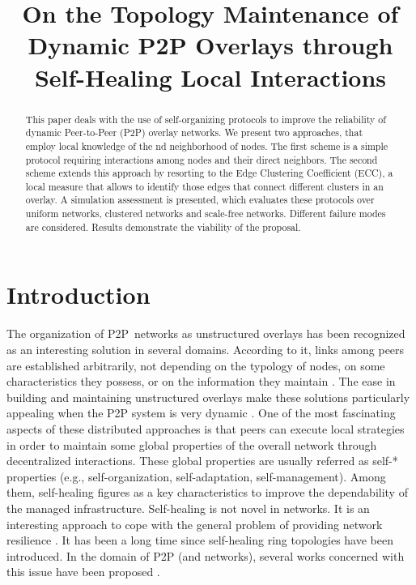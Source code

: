 \documentclass[10pt, conference, compsocconf]{IEEEtran}
\begin{document}
 
\title{On the Topology Maintenance of Dynamic P2P Overlays through Self-Healing Local Interactions}
\author{
}

\maketitle              
\begin{abstract}
This paper deals with the use of self-organizing protocols to improve the reliability of dynamic Peer-to-Peer (P2P) overlay networks. We present two approaches, that employ local knowledge of the nd neighborhood of nodes. The first scheme is a simple protocol requiring interactions among nodes and their direct neighbors. The second scheme extends this approach by resorting to the Edge Clustering Coefficient (ECC), a local measure that allows to identify those edges that connect different clusters in an overlay. A simulation assessment is presented, which evaluates these protocols over uniform networks, clustered networks and scale-free networks. Different failure modes are considered. Results demonstrate the viability of the proposal.
\end{abstract}

\section{Introduction}

The organization of \ac{P2P}~networks as unstructured overlays has been recognized as an interesting solution in several domains. According to it, links among peers are established arbitrarily, not depending on the typology of nodes, on some characteristics they possess, or on the information they maintain \cite{Luciano1,EberspacherS05a,simplex,Leitao}.
The ease in building and maintaining unstructured overlays make these solutions particularly appealing when the P2P system is very dynamic \cite{gridpeer,shimada}. 
One of the most fascinating aspects of these distributed approaches is that peers can execute local strategies in order to maintain some global properties of the overall network through decentralized interactions. These global properties are usually referred as self-* properties (e.g., self-organization, self-adaptation, self-management). Among them, self-healing figures as a key characteristics to improve the dependability of the managed infrastructure.
Self-healing is not novel in networks. It is an interesting approach to cope with the general problem of providing network resilience \cite{doerr}.
It has been a long time since self-healing ring topologies have been introduced.
In the domain of P2P (and networks), several works concerned with this issue have been proposed \cite{chaudhry,simplex,Pournarasb}.
\end{document}
